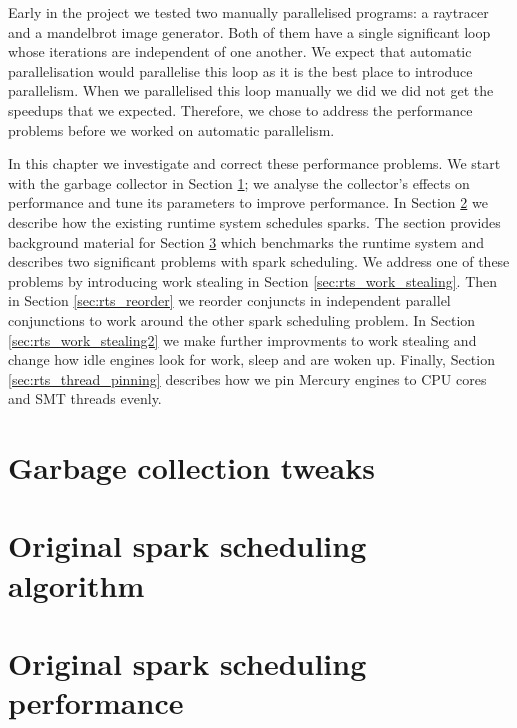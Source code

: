

Early in the project
we tested two manually parallelised programs:
a raytracer and a mandelbrot image generator.
Both of them have a single significant loop
whose iterations are independent of one another.
We expect that automatic parallelisation would parallelise this loop
as it is the best place to introduce parallelism.
When we parallelised this loop manually we did
we did not get the speedups that we expected.
Therefore,
we chose to address the performance problems
before we worked on automatic parallelism.

In this chapter we investigate and correct these performance problems.
We start with the garbage collector in Section \ref{sec:gc};
we analyse the collector's effects on performance and tune its parameters
to improve performance.
In Section \ref{sec:original_scheduling} we describe how the existing runtime
system schedules sparks.
The section provides background material for Section
\ref{sec:original_scheduling_performance}
which benchmarks the runtime system and describes two significant problems with
spark scheduling.
We address one of these problems by introducing work stealing in Section
\ref{sec:rts_work_stealing}.
Then in Section \ref{sec:rts_reorder} we reorder conjuncts in independent
parallel conjunctions to work around the other spark scheduling problem.
In Section \ref{sec:rts_work_stealing2} we make further improvments to
work stealing and change how idle engines look for work, sleep and are
woken up.
Finally, Section \ref{sec:rts_thread_pinning} describes how we pin Mercury
engines to CPU cores and SMT threads evenly.

\section{Garbage collection tweaks}
\label{sec:gc}



\section{Original spark scheduling algorithm}
\label{sec:original_scheduling}



\section{Original spark scheduling performance}
\label{sec:original_scheduling_performance}

